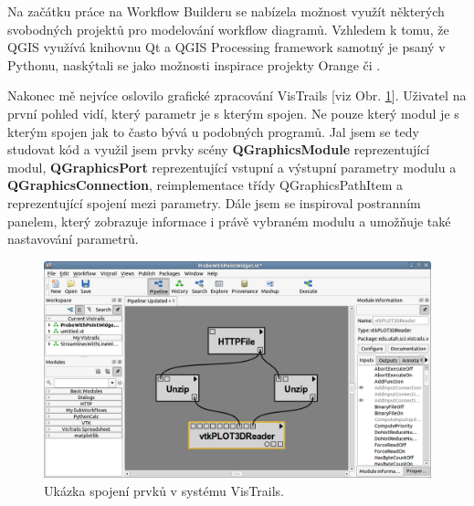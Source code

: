 Na začátku práce na Workflow Builderu se nabízela možnost využít některých svobodných projektů pro modelování workflow diagramů. Vzhledem k tomu, že QGIS využívá knihovnu Qt a QGIS Processing framework samotný je psaný  v Pythonu, naskýtali se jako možnosti inspirace projekty Orange či .

Nakonec mě nejvíce oslovilo grafické zpracování VisTrails [viz Obr. \ref{vt}]. Uživatel na první pohled vidí, který parametr je s kterým spojen. Ne pouze který modul je s kterým spojen jak to často bývá u podobných programů. Jal jsem se tedy studovat kód a využil jsem prvky scény \textbf{QGraphicsModule} reprezentující modul, \textbf{QGraphicsPort} reprezentující vstupní a výstupní parametry modulu a \textbf{QGraphicsConnection}, reimplementace třídy QGraphicsPathItem a  reprezentující spojení mezi parametry. Dále jsem se inspiroval postranním panelem, který zobrazuje informace i právě vybraném modulu a umožňuje také nastavování parametrů.

\newpage

\begin{figure}[h]
	\centering
	\includegraphics[scale=0.5]{pictures/qt/vt}
	\caption{Ukázka spojení prvků v systému VisTrails.}
	\label{vt}
\end{figure}
